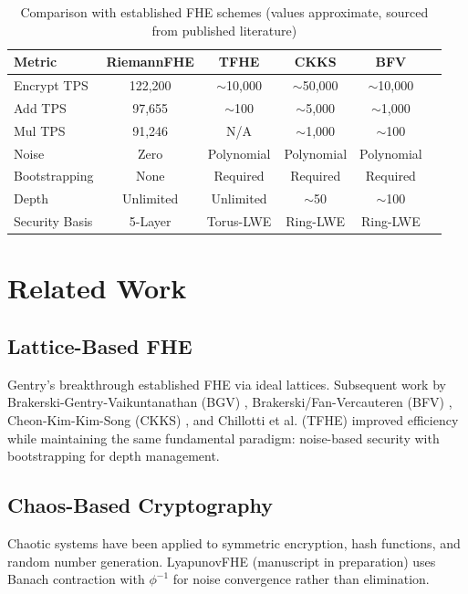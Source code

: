 \documentclass[11pt,a4paper]{article}
\theoremstyle{remark}
\begin{document}
\begin{table}[H]
\centering
\begin{tabular}{lccccc}
\toprule
\textbf{Metric} & \textbf{RiemannFHE} & \textbf{TFHE} & \textbf{CKKS} & \textbf{BFV} \\
\midrule
Encrypt TPS & 122,200 & $\sim$10,000 & $\sim$50,000 & $\sim$10,000 \\
Add TPS & 97,655 & $\sim$100 & $\sim$5,000 & $\sim$1,000 \\
Mul TPS & 91,246 & N/A & $\sim$1,000 & $\sim$100 \\
Noise & Zero & Polynomial & Polynomial & Polynomial \\
Bootstrapping & None & Required & Required & Required \\
Depth & Unlimited & Unlimited & $\sim$50 & $\sim$100 \\
Security Basis & 5-Layer & Torus-LWE & Ring-LWE & Ring-LWE \\
\bottomrule
\end{tabular}
\caption{Comparison with established FHE schemes (values approximate, sourced from published literature)}
\end{table}

\section{Related Work}

\subsection{Lattice-Based FHE}

Gentry's breakthrough \cite{gentry2009} established FHE via ideal lattices. Subsequent work by Brakerski-Gentry-Vaikuntanathan (BGV) \cite{bgv2014}, Brakerski/Fan-Vercauteren (BFV) \cite{bfv2012}, Cheon-Kim-Kim-Song (CKKS) \cite{ckks2017}, and Chillotti et al. (TFHE) \cite{tfhe2020} improved efficiency while maintaining the same fundamental paradigm: noise-based security with bootstrapping for depth management.

\subsection{Chaos-Based Cryptography}

Chaotic systems have been applied to symmetric encryption, hash functions, and random number generation. LyapunovFHE \cite{fernandez2026lyapunov} (manuscript in preparation) uses Banach contraction with $\phi^{-1}$ for noise convergence rather than elimination.
\end{document}
